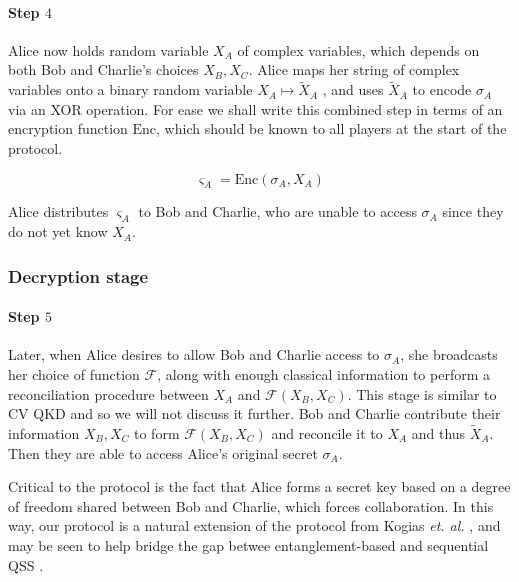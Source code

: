 
\paragraph{Step $4$} Alice now holds random variable $X_A$ of complex variables, which depends on both Bob and Charlie's choices $X_B, X_C$. Alice maps her string of complex variables onto a binary random variable $X_A \mapsto \tilde{X}_A$ \cite{Diamanti2015}, and uses $\tilde{X}_A$ to encode $\sigma_A$ via an XOR operation. For ease we shall write this combined step in terms of an encryption function $\text{Enc}$, which should be known to all players at the start of the protocol. %

\begin{equation}
\varsigma_A = \text{Enc}\left(\sigma_A, X_A\right)
\end{equation}

\noindent Alice distributes $\varsigma_A$ to Bob and Charlie, who are unable to access $\sigma_A$ since they do not yet know $X_A$.

\subsubsection*{Decryption stage}

\paragraph{Step $5$} Later, when Alice desires to allow Bob and Charlie access to $\sigma_A$, she broadcasts her choice of function $\mathcal{F}$, along with enough classical information to perform a reconciliation procedure between $X_A$ and $\mathcal{F}\left(X_B, X_C\right)$. This stage is similar to CV QKD and so we will not discuss it further. Bob and Charlie contribute their information $X_B, X_C$ to form $\mathcal{F}\left(X_B, X_C\right)$ and reconcile it to $X_A$ and thus $\tilde{X}_A$. Then they are able to access Alice's original secret $\sigma_A$.

Critical to the protocol is the fact that Alice forms a secret key based on a degree of freedom shared between Bob and Charlie, which forces collaboration. In this way, our protocol is a natural extension of the protocol from Kogias \emph{et. al.} \cite{Kogias2017}, and may be seen to help bridge the gap betwee entanglement-based and sequential QSS \cite{Grice2019}.

